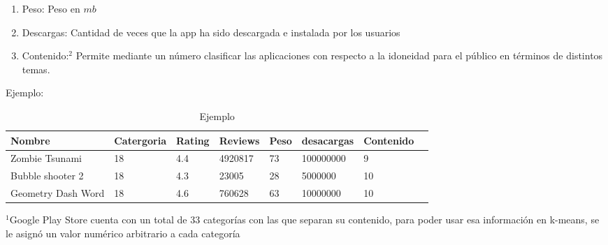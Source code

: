 \documentclass[10pt, a4paper]{article}
\begin{document}
\begin{enumerate}
\begin{enumerate}
\begin{enumerate}
\item Peso: Peso en $mb$
\item Descargas: Cantidad de veces que la app ha sido descargada e instalada por los usuarios
\item Contenido:$^{2}$ Permite mediante un n\'umero clasificar las aplicaciones con respecto a la idoneidad para el p\'ublico en t\'erminos de distintos temas.  
\end{enumerate}
Ejemplo: \\
\begin{table}[H]
\centering
\begin{tabular}{|l|l|l|l|l|l|l|l|}
\hline
Nombre             & Catergoria & Rating & Reviews & Peso & desacargas & Contenido \\ \hline
Zombie Tsunami     & 18         & 4.4    & 4920817 & 73   & 100000000            & 9  \\ \hline
Bubble shooter 2   & 18         & 4.3    & 23005   & 28   & 5000000              & 10 \\ \hline
Geometry Dash Word & 18         & 4.6    & 760628  & 63   & 10000000             & 10 \\ \hline
\end{tabular}
\caption{Ejemplo}
\label{Ejemplo}
\end{table}
\end{enumerate} 
\end{enumerate}
$^{1}$Google Play Store cuenta con un total de 33 categor\'ias con las que separan su contenido, para poder usar esa informaci\'on en k-means, se le asign\'o un valor num\'erico arbitrario a cada categor\'ia\\
\end{document}
